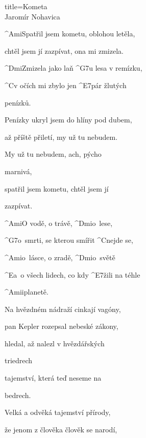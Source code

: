 \begin{song}{title=\predtitle\centering Kometa \\\large Jaromír Nohavica \vspace*{-0.3cm}}  %
\begin{centerjustified}

\begin{varwidth}[t]{0.48\textwidth}\setlength{\parindent}{0.45cm}  %
\sloka 
	^{Ami\z }Spatřil jsem kometu, oblohou letěla,
	
	chtěl jsem jí zazpívat, ona mi zmizela.
	
	^{Dmi\z }Zmizela jako laň ^{G7}u lesa v remízku,
	
	^{C}v očích mi zbylo jen ^{E7}pár žlutých 

	penízků.

\sloka
	Penízky ukryl jsem do hlíny pod dubem,
	
	až příště přiletí, my už tu nebudem.
	
	My už tu nebudem, ach, pýcho 

	marnivá,
	
	spatřil jsem kometu, chtěl jsem jí 
	
	zazpívat.
	
	^{Ami}O vodě, o trávě, ^{Dmi\z }o~lese,
	
	^{G7\z }o~smrti, se kterou smířit ^{C\z }nejde se,
	
	^{Ami\z }o~lásce, o zradě, ^{Dmi\z}o~světě
	
	^{E\z}a~o všech lidech, co kdy ^{E7}žili na téhle 
	
	 ^{Amii\z }planetě.
	
\sloka	
	Na hvězdném nádraží cinkají vagóny,
	
	pan Kepler rozepsal nebeské zákony,
	
	hledal, až nalezl v hvězdářských 

	triedrech
	
	tajemství, která teď neseme na 

	bedrech.

\end{varwidth}\mezisloupci\begin{varwidth}[t]{0.5\textwidth}\setlength{\parindent}{0.45cm}
\vspace*{0.375cm}  %
\sloka
	Velká a odvěká tajemství přírody,
	
	že jenom z člověka člověk se narodí,
	

\end{varwidth}
\end{centerjustified}
\end{song}

